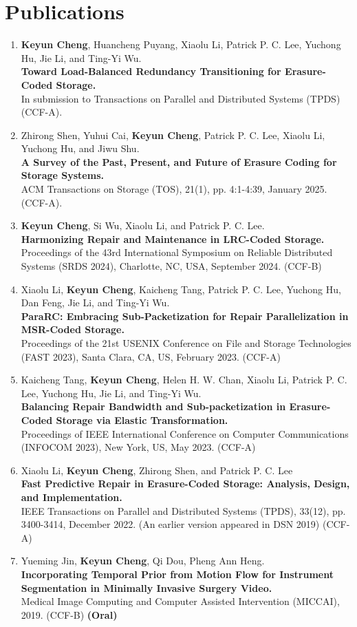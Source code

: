 \documentclass[letterpaper,11pt]{article}
\newcommand{\publication}[4]{#1 \\ {\bf #2} \\ #3 #4 \vspace{-4pt}}
\begin{document}
\section{Publications}
\begin{enumerate}
\item \publication{{\bf Keyun Cheng}, Huancheng Puyang, Xiaolu Li, Patrick P.
C. Lee, Yuchong Hu, Jie Li, and Ting-Yi Wu.}{Toward Load-Balanced Redundancy
Transitioning for Erasure-Coded Storage.}{In submission to Transactions on
Parallel and Distributed Systems (TPDS) (CCF-A).}{}
  \item \publication{Zhirong Shen, Yuhui Cai, {\bf Keyun Cheng}, Patrick P. C.
Lee, Xiaolu Li, Yuchong Hu, and Jiwu Shu.}{A Survey of the Past, Present, and
Future of Erasure Coding for Storage Systems.}{ACM Transactions on Storage (TOS), 21(1), pp. 4:1-4:39, January 2025. (CCF-A).}{}
\item \publication{{\bf Keyun Cheng}, Si Wu, Xiaolu Li, and Patrick P. C.
Lee.}{Harmonizing Repair and Maintenance in LRC-Coded Storage.}{Proceedings of
the 43rd International Symposium on Reliable Distributed Systems (SRDS 2024),
Charlotte, NC, USA, September 2024. (CCF-B)}{}
\item \publication{Xiaolu Li, {\bf Keyun Cheng}, Kaicheng Tang, Patrick P. C.
Lee, Yuchong Hu, Dan Feng, Jie Li, and Ting-Yi Wu.}{ParaRC: Embracing
Sub-Packetization for Repair Parallelization in MSR-Coded
Storage.}{Proceedings of the 21st USENIX Conference on File and Storage
Technologies (FAST 2023), Santa Clara, CA, US, February 2023. (CCF-A)}{}
\item \publication{Kaicheng Tang, {\bf Keyun Cheng}, Helen H. W. Chan, Xiaolu
Li, Patrick P. C. Lee, Yuchong Hu, Jie Li, and Ting-Yi Wu.}{Balancing Repair
Bandwidth and Sub-packetization in Erasure-Coded Storage via Elastic
Transformation.}{Proceedings of IEEE International Conference on Computer
Communications (INFOCOM 2023), New York, US, May 2023. (CCF-A)}{}
  \item \publication{Xiaolu Li, {\bf Keyun Cheng}, Zhirong Shen, and Patrick P. C. Lee}{Fast Predictive Repair in Erasure-Coded Storage: Analysis, Design, and Implementation.}{IEEE Transactions on Parallel and Distributed Systems (TPDS), 33(12), pp. 3400-3414, December 2022.
  (An earlier version appeared in DSN 2019) (CCF-A)}{}
  \item \publication{Yueming Jin, {\bf Keyun Cheng}, Qi Dou, Pheng Ann
Heng.}{Incorporating Temporal Prior from Motion Flow for Instrument
Segmentation in Minimally Invasive Surgery Video.}{Medical Image Computing and
Computer Assisted Intervention (MICCAI), 2019. (CCF-B)}{\bf (Oral)}
\end{enumerate}
\end{document}
